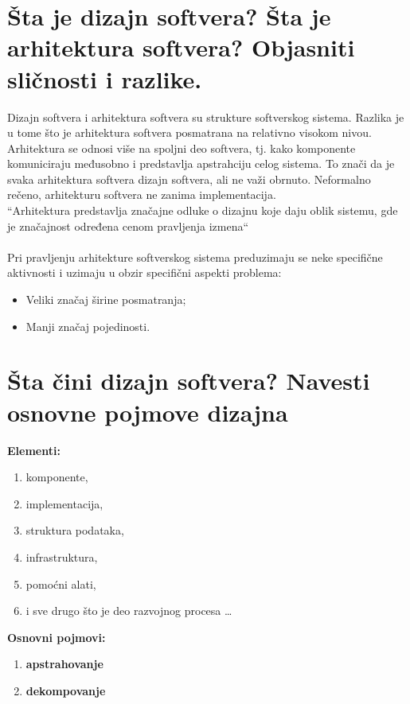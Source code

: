 \documentclass[a4paper]{article}
\begin{document}
\section{Šta je dizajn softvera? Šta je arhitektura softvera? Objasniti sličnosti i razlike.}
  \indent Dizajn softvera i arhitektura softvera su strukture softverskog sistema. Razlika je u
  tome što je arhitektura softvera posmatrana na relativno visokom nivou. Arhitektura se odnosi više
  na spoljni deo softvera, tj. kako komponente komuniciraju međusobno i predstavlja apstrahciju 
  celog sistema. To znači da je svaka arhitektura softvera dizajn softvera, ali ne važi obrnuto.
  Neformalno rečeno, arhitekturu softvera ne zanima implementacija. \\

  ``Arhitektura predstavlja značajne odluke o dizajnu koje daju oblik sistemu, gde je značajnost
  određena cenom pravljenja izmena``
  \\[5pt]
  \\

  Pri pravljenju arhitekture softverskog sistema preduzimaju se neke specifične aktivnosti i
  uzimaju u obzir specifični aspekti problema:
  \begin{itemize}
    \item Veliki značaj širine posmatranja;
    \item Manji značaj pojedinosti. 
  \end{itemize}

\section{Šta čini dizajn softvera? Navesti osnovne pojmove dizajna}
  \noindent \textbf{Elementi:}
  \begin{enumerate}
    \item komponente,
    \item implementacija,
    \item struktura podataka,
    \item infrastruktura,
    \item pomoćni alati,
    \item i sve drugo što je deo razvojnog procesa \dots
  \end{enumerate}
  \textbf{Osnovni pojmovi:}
  \begin{enumerate}
    \item \textbf{apstrahovanje}
    \item \textbf{dekompovanje}
  \end{enumerate}
\end{document}
